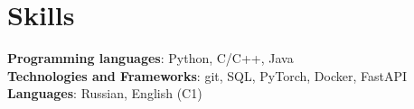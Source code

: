\documentclass[english,russian,letterpaper,11pt]{article}
\begin{document}
\section{Skills}
 \begin{itemize}[leftmargin=0.15in, label={}]
    \small{\item{
     \textbf{Programming languages}{: Python, C/C++, Java} \\
     \textbf{Technologies and Frameworks}{: git, SQL, PyTorch, Docker, FastAPI } \\
     \textbf{Languages}{: Russian, English (C1)} \\
    }}
 \end{itemize}

\end{document}
